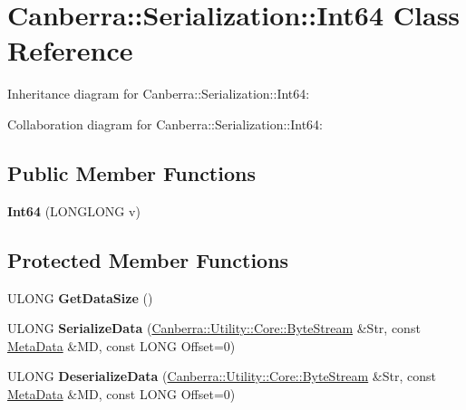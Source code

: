 \hypertarget{class_canberra_1_1_serialization_1_1_int64}{}\section{Canberra\+:\+:Serialization\+:\+:Int64 Class Reference}
\label{class_canberra_1_1_serialization_1_1_int64}


Inheritance diagram for Canberra\+:\+:Serialization\+:\+:Int64\+:


Collaboration diagram for Canberra\+:\+:Serialization\+:\+:Int64\+:
\subsection*{Public Member Functions}
\begin{DoxyCompactItemize}
\item 
\mbox{\label{class_canberra_1_1_serialization_1_1_int64_ab3439456cceb80f36a7eed60fd1f1075}} 
{\bfseries Int64} (L\+O\+N\+G\+L\+O\+NG v)
\end{DoxyCompactItemize}
\subsection*{Protected Member Functions}
\begin{DoxyCompactItemize}
\item 
\mbox{\label{class_canberra_1_1_serialization_1_1_int64_aeb668ca5917040791074d6ff715aa619}} 
U\+L\+O\+NG {\bfseries Get\+Data\+Size} ()
\item 
\mbox{\label{class_canberra_1_1_serialization_1_1_int64_a6bdbfcc2fe3f244f695d4f6a380d93bc}} 
U\+L\+O\+NG {\bfseries Serialize\+Data} (\hyperlink{class_canberra_1_1_utility_1_1_core_1_1_byte_stream}{Canberra\+::\+Utility\+::\+Core\+::\+Byte\+Stream} \&Str, const \hyperlink{class_canberra_1_1_serialization_1_1_meta_data}{Meta\+Data} \&MD, const L\+O\+NG Offset=0)
\item 
\mbox{\label{class_canberra_1_1_serialization_1_1_int64_a6792d4c57b639b99fd0b829be071ccf0}} 
U\+L\+O\+NG {\bfseries Deserialize\+Data} (\hyperlink{class_canberra_1_1_utility_1_1_core_1_1_byte_stream}{Canberra\+::\+Utility\+::\+Core\+::\+Byte\+Stream} \&Str, const \hyperlink{class_canberra_1_1_serialization_1_1_meta_data}{Meta\+Data} \&MD, const L\+O\+NG Offset=0)
\end{DoxyCompactItemize}
